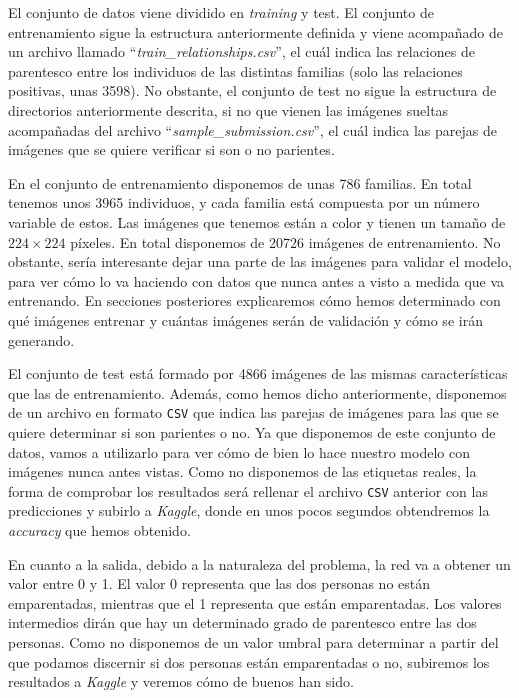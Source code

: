 \documentclass[11pt,a4paper]{article}
\begin{document}
El conjunto de datos viene dividido en \textit{training} y test. El conjunto de entrenamiento sigue la estructura
anteriormente definida y viene acompañado de un archivo llamado ``\textit{train\_relationships.csv}'', el
cuál indica las relaciones de parentesco entre los individuos de las distintas familias (solo las relaciones
positivas, unas 3598). No obstante, el conjunto de test no sigue la estructura de directorios anteriormente descrita,
si no que vienen las imágenes sueltas acompañadas del archivo ``\textit{sample\_submission.csv}'', el cuál
indica las parejas de imágenes que se quiere verificar si son o no parientes.

En el conjunto de entrenamiento disponemos de unas 786 familias. En total tenemos unos 3965 individuos, y cada
familia está compuesta por un número variable de estos. Las imágenes que tenemos están a color y tienen un
tamaño de $224 \times 224$ píxeles. En total disponemos de 20726 imágenes de entrenamiento. No obstante, sería
interesante dejar una parte de las imágenes para validar el modelo, para ver cómo lo va haciendo con datos
que nunca antes a visto a medida que va entrenando. En secciones posteriores explicaremos cómo
hemos determinado con qué imágenes entrenar y cuántas imágenes serán de validación y cómo se irán generando.

El conjunto de test está formado por 4866 imágenes de las mismas características que las de entrenamiento.
Además, como hemos dicho anteriormente, disponemos de un archivo en formato \texttt{CSV} que indica
las parejas de imágenes para las que se quiere determinar si son parientes o no. Ya que disponemos de este
conjunto de datos, vamos a utilizarlo para ver cómo de bien lo hace nuestro modelo con imágenes nunca antes
vistas. Como no disponemos de las etiquetas reales, la forma de comprobar los resultados será rellenar el archivo
\texttt{CSV} anterior con las predicciones y subirlo a \textit{Kaggle}, donde en unos pocos segundos obtendremos
la \textit{accuracy} que hemos obtenido.

En cuanto a la salida, debido a la naturaleza del problema, la red va a obtener un valor entre 0 y 1.
El valor 0 representa que las dos personas no están emparentadas, mientras que el 1 representa que
están emparentadas. Los valores intermedios dirán que hay un determinado grado de parentesco entre
las dos personas. Como no disponemos de un valor umbral para determinar a partir del que podamos discernir
si dos personas están emparentadas o no, subiremos los resultados a \textit{Kaggle} y veremos cómo de buenos
han sido.
\end{document}
